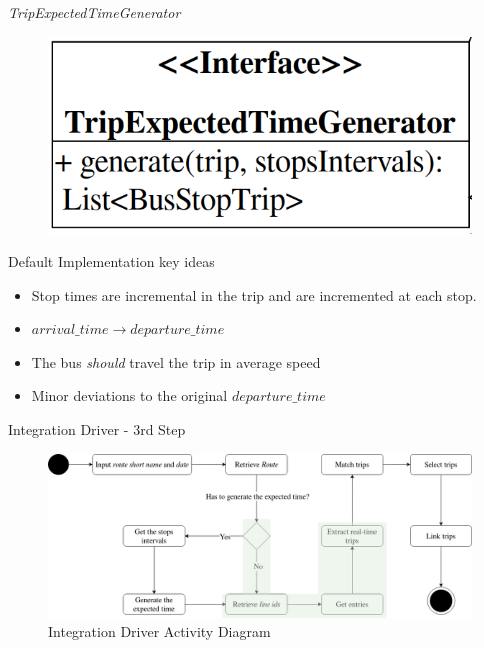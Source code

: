 \documentclass[xcolor=dvipsnames,table]{beamer}
\begin{document}
\begin{frame}{\textit{TripExpectedTimeGenerator}}
        \begin{figure}[H]
                \centering
                \includegraphics[scale=0.25]{images/TripExpectedTimeGenerator.png}
        \end{figure}
        \begin{block}{Default Implementation key ideas}
                \begin{itemize}
                        \item Stop times are incremental in the trip
                                and are incremented at each stop.
                        \item $arrival\_time \rightarrow departure\_time$
                        \item The bus {\em should} travel the trip in average speed
                        \item Minor deviations to the original $departure\_time$
                \end{itemize}
        \end{block}
\end{frame}

\begin{frame}{Integration Driver - 3rd Step}
        \begin{figure}[H]
                \centering
                \includegraphics[width = \textwidth]{images/integrationDriverAD(3rd_step).png}
                \caption{Integration Driver Activity Diagram}
        \end{figure}
\end{frame}
\end{document}
